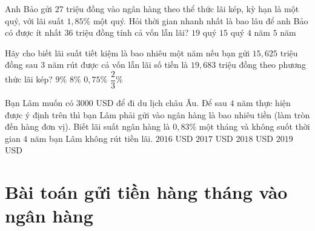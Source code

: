 \begin{vd}%
	Anh Bảo gửi $27$ triệu đồng vào ngân hàng theo thể thức lãi kép, kỳ hạn là một quý, với lãi suất $1,85\% $ một quý. Hỏi thời gian nhanh nhất là bao lâu để anh Bảo có được ít nhất $36$ triệu đồng tính cả vốn lẫn lãi?\newline
	\choice
	{$19$ quý}
	{$15$ quý}
	{\True $4$ năm}
	{$5$ năm}
\end{vd}

\begin{vd}%
	Hãy cho biết lãi suất tiết kiệm là bao nhiêu một năm nếu bạn gửi $15,625$ triệu đồng sau $3$ năm rút được cả vốn lẫn lãi số tiền là $19,683$ triệu đồng theo phương thức lãi kép?\newline
	\choice
	{$9\%$}
	{\True $8\%$}
	{$0,75\% $}
	{$\dfrac{2}{3}\% $}
\end{vd}

\begin{vd}%
	Bạn Lâm muốn có $3000$ USD để đi du lịch châu Âu. Để sau $4$ năm thực hiện được ý định trên thì bạn Lâm phải gửi vào ngân hàng là bao nhiêu tiền (làm tròn đến hàng đơn vị). Biết lãi suất ngân hàng là $0,83\% $ một tháng và không suốt thời gian $4$ năm bạn Lâm không rút tiền lãi.\newline
	\choice
	{$2016$ USD}
	{$2017$ USD}
	{\True $2018$ USD}
	{$2019$ USD}
\end{vd}

\section{Bài toán gửi tiền hàng tháng vào ngân hàng}
